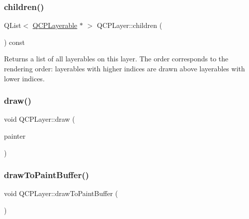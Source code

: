 \mbox{\label{class_q_c_p_layer_a183b90941fc78f0b136edd77c5fb6966}} 
\subsubsection{\texorpdfstring{children()}{children()}}
{\footnotesize\ttfamily Q\+List$<$ \hyperlink{class_q_c_p_layerable}{Q\+C\+P\+Layerable} $\ast$ $>$ Q\+C\+P\+Layer\+::children (\begin{DoxyParamCaption}{ }\end{DoxyParamCaption}) const\hspace{0.3cm}{\ttfamily [inline]}}

Returns a list of all layerables on this layer. The order corresponds to the rendering order\+: layerables with higher indices are drawn above layerables with lower indices. \mbox{\label{class_q_c_p_layer_ab831a99c8d30b15ec4533ca341e8813b}} 
\subsubsection{\texorpdfstring{draw()}{draw()}}
{\footnotesize\ttfamily void Q\+C\+P\+Layer\+::draw (\begin{DoxyParamCaption}\item[{\hyperlink{class_q_c_p_painter}{Q\+C\+P\+Painter} $\ast$}]{painter }\end{DoxyParamCaption})\hspace{0.3cm}{\ttfamily [protected]}}

\mbox{\label{class_q_c_p_layer_a4a8e0a86f31462299e7fc8e8158dd2c6}} 
\subsubsection{\texorpdfstring{draw\+To\+Paint\+Buffer()}{drawToPaintBuffer()}}
{\footnotesize\ttfamily void Q\+C\+P\+Layer\+::draw\+To\+Paint\+Buffer (\begin{DoxyParamCaption}{ }\end{DoxyParamCaption})\hspace{0.3cm}{\ttfamily [protected]}}

